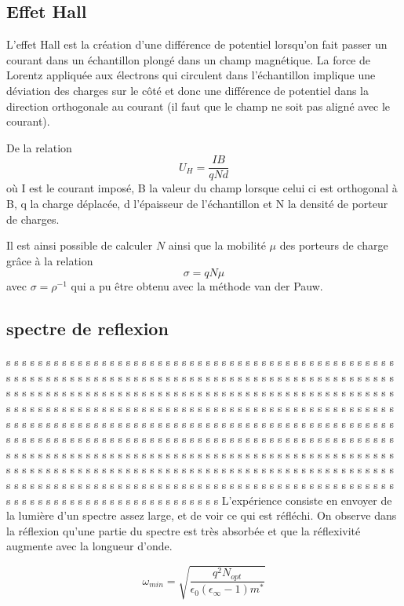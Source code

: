 \documentclass[a4paper,12pt,oneside]{article}
\def \be {\begin{equation}}
\def \ee {\end{equation}}
\begin{document}
\subsection{Effet Hall}
	L'effet Hall est la création d'une différence de potentiel lorsqu'on fait passer un courant dans un échantillon plongé dans un champ magnétique. La force de Lorentz appliquée aux électrons qui circulent dans l'échantillon implique une déviation des charges sur le côté et donc une différence de potentiel dans la direction orthogonale au courant (il faut que le champ ne soit pas aligné avec le courant).

	De la relation
	\be
		U_H = \frac{IB}{qNd}
	\ee
	où I est le courant imposé, B la valeur du champ lorsque celui ci est orthogonal à B, q la charge déplacée, d l'épaisseur de l'échantillon et N la densité de porteur de charges.

	Il est ainsi possible de calculer $N$ ainsi que la mobilité $\mu$ des porteurs de charge grâce à la relation
	\be
		\sigma = q N \mu
	\ee
	avec $\sigma=\rho^{-1}$ qui a pu être obtenu avec la méthode van der Pauw.

\subsection{spectre de reflexion}
s s s s s s s s s s s s s s s s s s s s s s s s s s s s s s s s s s s s s s s s s s s s s s s s s s s s s s s s s s s s s s s s s s s s s s s s s s s s s s s s s s s s s s s s s s s s s s s s s s s s s s s s s s s s s s s s s s s s s s s s s s s s s s s s s s s s s s s s s s s s s s s s s s s s s s s s s s s s s s s s s s s s s s s s s s s s s s s s s s s s s s s s s s s s s s s s s s s s s s s s s s s s s s s s s s s s s s s s s s s s s s s s s s s s s s s s s s s s s s s s s s s s s s s s s s s s s s s s s s s s s s s s s s s s s s s s s s s s s s s s s s s s s s s s s s s s s s s s s s s s s s s s s s s s s s s s s s s s s s s s s s s s s s s s s s s s s s s s s s s s s s s s s s s s s s s s s s s s s s s s s s s s s s s s s s s s s s s s s s s s s s s s s s s s s s s s s s s s s s s s s s s s s s s s s s s s s s s s s s s s s s s s s s s s s s s s s s s s s s s s s s s s s s s s s s s s s s s s s s s s s s s s s s s s 
L'expérience consiste en envoyer de la lumière d'un spectre assez large, et de voir ce qui est réfléchi. On observe dans la réflexion qu'une partie du spectre est très absorbée et que la réflexivité augmente avec la longueur d'onde. 

\be
	\omega_{min}=\sqrt{ \frac{q^2 N_{opt}} {\epsilon_0(\epsilon_\infty-1)m^*} }
\ee
\end{document}
